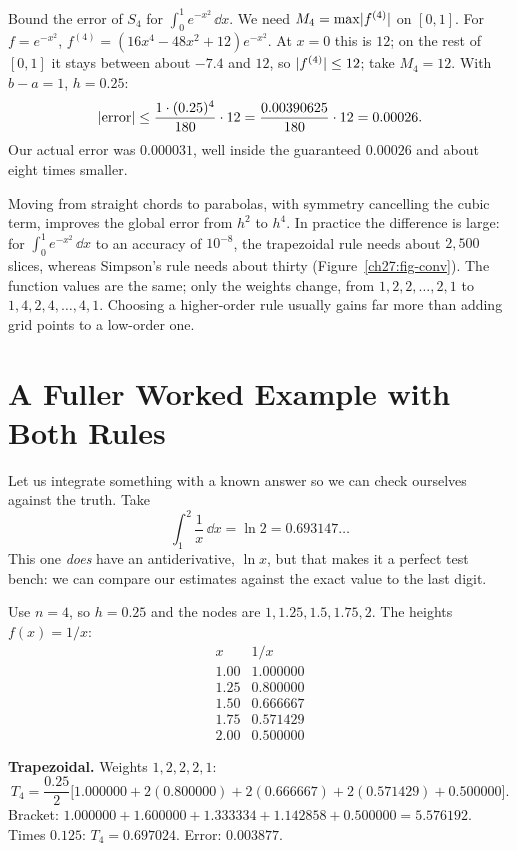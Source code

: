 \begin{labbox}
Bound the error of $S_4$ for $\int_0^1 e^{-x^2}\,\dd x$. We need $M_4 = \max\lvert f^{(4)}\rvert$ on $[0,1]$. For $f = e^{-x^2}$, $f^{(4)} = (16x^4 - 48x^2 + 12)e^{-x^2}$. At $x = 0$ this is $12$; on the rest of $[0,1]$ it stays between about $-7.4$ and $12$, so $\lvert f^{(4)}\rvert \le 12$; take $M_4 = 12$. With $b-a=1$, $h=0.25$:
\[
\lvert\text{error}\rvert \le \frac{1\cdot (0.25)^4}{180}\cdot 12 = \frac{0.00390625}{180}\cdot 12 = 0.00026.
\]
Our actual error was $0.000031$, well inside the guaranteed $0.00026$ and about eight times smaller.
\end{labbox}

\begin{aestheticbox}
Moving from straight chords to parabolas, with symmetry cancelling the cubic term, improves the global error from $h^2$ to $h^4$. In practice the difference is large: for $\int_0^1 e^{-x^2}\,\dd x$ to an accuracy of $10^{-8}$, the trapezoidal rule needs about $2{,}500$ slices, whereas Simpson's rule needs about thirty (Figure~\ref{ch27:fig-conv}). The function values are the same; only the weights change, from $1,2,2,\dots,2,1$ to $1,4,2,4,\dots,4,1$. Choosing a higher-order rule usually gains far more than adding grid points to a low-order one.
\end{aestheticbox}

\section{A Fuller Worked Example with Both Rules}
\label{ch27:worked}

Let us integrate something with a known answer so we can check ourselves against the truth. Take
\[
\int_1^2 \frac{1}{x}\,\dd x = \ln 2 = 0.693147\ldots
\]
This one \emph{does} have an antiderivative, $\ln x$, but that makes it a perfect test bench: we can compare our estimates against the exact value to the last digit.

Use $n = 4$, so $h = 0.25$ and the nodes are $1, 1.25, 1.5, 1.75, 2$. The heights $f(x) = 1/x$:
\[
\begin{array}{c|c}
x & 1/x\\\hline
1.00 & 1.000000\\
1.25 & 0.800000\\
1.50 & 0.666667\\
1.75 & 0.571429\\
2.00 & 0.500000
\end{array}
\]

\textbf{Trapezoidal.} Weights $1,2,2,2,1$:
\[
T_4 = \frac{0.25}{2}\big[1.000000 + 2(0.800000) + 2(0.666667) + 2(0.571429) + 0.500000\big].
\]
Bracket: $1.000000 + 1.600000 + 1.333334 + 1.142858 + 0.500000 = 5.576192$. Times $0.125$: $T_4 = 0.697024$. Error: $0.003877$.


